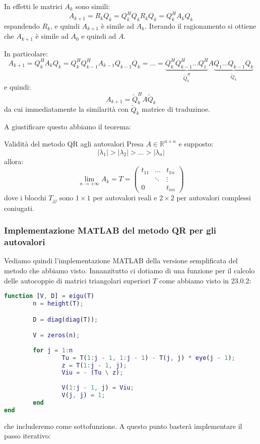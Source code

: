 \documentclass[a4paper,11pt]{article}
\begin{document}
In effetti le matrici $A_k$ sono simili:
$$
A_{k + 1} = R_k Q_k = Q_k^H Q_k R_k Q_k = Q_k^H A_k Q_k
$$
espandendo $R_k$, e quindi $A_{k + 1}$ è simile ad $A_k$.
Iterando il ragionamento si ottiene che $A_{k + 1}$ è simile ad $A_0$ e quindi ad $A$.

In particolare:
$$
A_{k + 1} = Q_k^H A_k Q_k = Q_k^H Q_{k - 1}^H A_{k - 1} Q_{k - 1} Q_k
= ... = \underbrace{ Q_k^H Q_{k - 1}^H ... Q_1^H }_{\tilde{Q}_k^H} A \underbrace{ Q_1 ... Q_{k - 1} Q_k }_{\tilde{Q}_k}
$$
e quindi:
$$
A_{k + 1} = \tilde{Q}_k^H A \tilde{Q}_k
$$
da cui immediatamente la similarità con $\tilde{Q}_k$ matrice di traduzinoe.

A giustificare questo abbiamo il teorema:
\begin{theorem}{Validità del metodo QR agli autovalori}
	Presa $A \in \mathbb{R}^{n \times n}$ e supposto:
	$$
	|\lambda_1| > |\lambda_2| > ... > |\lambda_n|
	$$
	allora:
	$$
	\lim_{n \rightarrow +\infty} A_k = T = 
\begin{pmatrix}
	t_{11} & ... & t_{1n} \\ 
				 & \ddots & \vdots \\
	0 & & t_{nn}
\end{pmatrix}
	$$
	dove i blocchi $T_{jj}$ sono $1 \times 1$ per autovalori reali e $2 \times 2$ per autovalori complessi coniugati.
\end{theorem}

\subsubsection{Implementazione MATLAB del metodo QR per gli autovalori}
Vediamo quindi l'implementazione MATLAB della versione semplificata del metodo che abbiamo visto.
Innanzitutto ci dotiamo di una funzione per il calcolo delle autocoppie di matrici triangolari superiori $T$ come abbiamo visto in 23.0.2:
\begin{lstlisting}[language=MATLAB, style=codestyle]	
function [V, D] = eigu(T)
		n = height(T);

		D = diag(diag(T));

		V = zeros(n);
		
		for j = 1:n
				Tu = T(1:j - 1, 1:j - 1) - T(j, j) * eye(j - 1);
				z = T(1:j - 1, j);
				Viu = - (Tu \ z);
				
				V(1:j - 1, j) = Viu;
				V(j, j) = 1;
		end
end
\end{lstlisting}
che includeremo come sottofunzione.
A questo punto basterà implementare il passo iterativo:
\lstset{style=codestyle, language=MATLAB}

\end{document}
